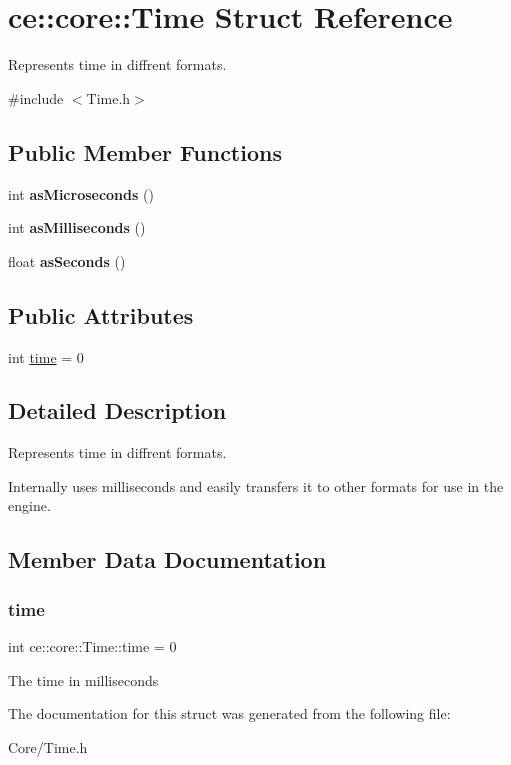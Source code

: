 \hypertarget{structce_1_1core_1_1_time}{}\section{ce\+:\+:core\+:\+:Time Struct Reference}
\label{structce_1_1core_1_1_time}


Represents time in diffrent formats.  




{\ttfamily \#include $<$Time.\+h$>$}

\subsection*{Public Member Functions}
\begin{DoxyCompactItemize}
\item 
\mbox{\label{structce_1_1core_1_1_time_aa418056d22ac6c29edfb05a5bba319ec}} 
int {\bfseries as\+Microseconds} ()
\item 
\mbox{\label{structce_1_1core_1_1_time_a7e4e98c781cc94efff0092fcf373b067}} 
int {\bfseries as\+Milliseconds} ()
\item 
\mbox{\label{structce_1_1core_1_1_time_a2d55e757931da557abf5ec8a73404f47}} 
float {\bfseries as\+Seconds} ()
\end{DoxyCompactItemize}
\subsection*{Public Attributes}
\begin{DoxyCompactItemize}
\item 
int \hyperlink{structce_1_1core_1_1_time_a9c46ccd85022eb7a5374b2a28cfc9c97}{time} = 0
\end{DoxyCompactItemize}


\subsection{Detailed Description}
Represents time in diffrent formats. 

Internally uses milliseconds and easily transfers it to other formats for use in the engine. 

\subsection{Member Data Documentation}
\mbox{\label{structce_1_1core_1_1_time_a9c46ccd85022eb7a5374b2a28cfc9c97}} 
\subsubsection{\texorpdfstring{time}{time}}
{\footnotesize\ttfamily int ce\+::core\+::\+Time\+::time = 0}

The time in milliseconds 

The documentation for this struct was generated from the following file\+:\begin{DoxyCompactItemize}
\item 
Core/Time.\+h\end{DoxyCompactItemize}
